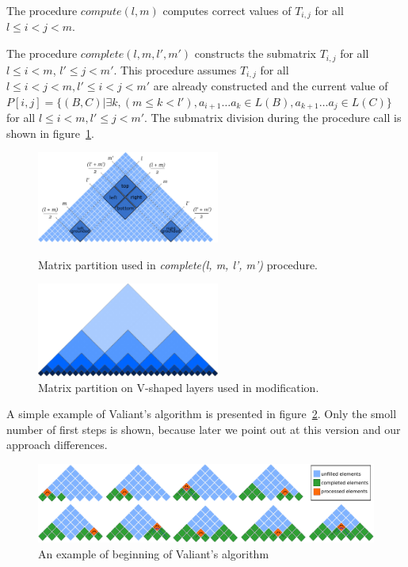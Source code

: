 The procedure $compute(l, m)$ computes correct values of $T_{i,j}$ for all $l \le i < j < m$.

The procedure $complete(l, m, l', m')$ constructs the submatrix $T_{i, j}$ for all $l \le i < m$, $l' \le j < m'$. This procedure assumes $T_{i, j}$ for all $l \leq i < j < m,  l' \leq i < j < m'$ are already constructed and the current value of  $P[i, j] =  \{ (B, C) |\exists k, (m \le k < l'), a_{i + 1} \dots a_{k} \in L(B), a_{k + 1} \dots a_{j} \in L(C)\}$ for all $l \leq i < m,  l' \leq j < m'$. The submatrix division during the procedure call is shown in figure~\ref{fig2}.


\begin{figure}[h]
\vspace{3mm}
 \begin{center}
    \begin{minipage}{0.48\textwidth}
        \centering
        \includegraphics[width=6cm]{pictures/splitting_with_grounded.pdf}
        \caption{Matrix partition used in \textit{complete(l, m, l', m')} procedure.}
        \label{fig1}
    \end{minipage}\hfill
    \begin{minipage}{0.48\textwidth}
        \centering
        \includegraphics[width=6cm]{pictures/layers.pdf}
        \caption{Matrix partition on V-shaped layers used in modification.}
        \label{fig2}
    \end{minipage}
 \end{center}
\vspace{-8mm}
\end{figure}

A simple example of Valiant's algorithm is presented in figure~\ref{fig3}.
Only the smoll number of first steps is shown, because later we point out at this version and our approach differences.

\begin{figure}[h]
\vspace{3mm}
 \begin{center}
 \includegraphics[width=12cm]{pictures/valbeg2.pdf}
    \caption{An example of beginning of Valiant's algorithm}
    \label{fig3}
\end{center}
\vspace{-8mm}
\end{figure}
